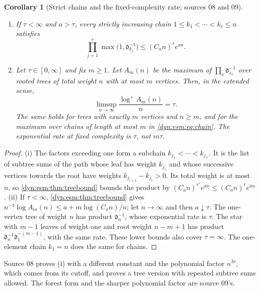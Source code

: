 \documentclass[11pt,letterpaper]{article}
\newtheorem{corollary}[corollary]{Corollary}
\theoremstyle{definition}
\theoremstyle{remark}
\numberwithin{equation}{section}
\begin{document}
\begin{corollary}[Strict chains and the fixed-complexity rate; sources 08 and 09]
\label{dyn:esm:cor:chain}
\begin{enumerate}[label=(\roman*)]
\item If $\tau<\infty$ and $a>\tau$, every strictly increasing chain
$1\le k_1<\cdots<k_r\le n$ satisfies
\begin{equation}\label{dyn:esm:eq:chain}
 \prod_{j=1}^{r}\max\bigl(1,\mathfrak d_{k_j}^{-1}\bigr)\le(C_an)^{r}e^{an}.
\end{equation}
\item Let $\tau\in[0,\infty]$ and fix $m\ge1$. Let $A_m(n)$ be the maximum of
$\prod_v\mathfrak d_{s_v}^{-1}$ over rooted trees of total weight $n$ with
at most $m$ vertices. Then, in the extended sense,
\begin{equation}\label{dyn:esm:eq:treerate}
 \limsup_{n\to\infty}\frac{\log^{+}A_m(n)}{n}=\tau .
\end{equation}
The same holds for trees with exactly $m$ vertices and $n\ge m$, and for
the maximum over chains of length at most $m$ in \eqref{dyn:esm:eq:chain}.
The exponential rate at fixed complexity is $\tau$, not $m\tau$.
\end{enumerate}
\end{corollary}
\begin{proof}
(i) The factors exceeding one form a subchain
$k_{j_1}<\cdots<k_{j_{r'}}$. It is the list of subtree sums of the path whose
leaf has weight $k_{j_1}$ and whose successive vertices towards the root
have weights $k_{j_{i+1}}-k_{j_i}>0$. Its total weight is at most $n$, so
\cref{dyn:esm:thm:treebound} bounds the product by
$(C_an)^{r'}e^{an}\le(C_an)^{r}e^{an}$.
(ii) If $\tau<\infty$, \cref{dyn:esm:thm:treebound} gives
$n^{-1}\log A_m(n)\le a+m\log(C_an)/n$; let $n\to\infty$ and then
$a\downarrow\tau$. The one-vertex tree of weight $n$ has product
$\mathfrak d_n^{-1}$, whose exponential rate is $\tau$. The star with $m-1$
leaves of weight one and root weight $n-m+1$ has product
$\mathfrak d_n^{-1}\mathfrak d_1^{-(m-1)}$, with the same rate. These lower
bounds also cover $\tau=\infty$. The one-element chain $k_1=n$ does the
same for chains.
\end{proof}

Source 08 proves (i) with a different constant and the polynomial factor
$n^{3r}$, which comes from its cutoff, and proves a tree version with
repeated subtree sums allowed. The forest form and the sharper polynomial
factor are source 09's.
\end{document}
